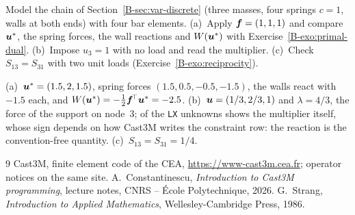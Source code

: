 
\label{exo:cc-springs}
%
Model the chain of Section~\ref{B-sec:var-discrete} (three masses, four
springs $c=1$, walls at both ends) with four bar elements. (a)~Apply
$\bm{f}=(1,1,1)$ and compare $\bm{u}^\ast$, the spring forces, the wall reactions and
$W(\bm{u}^\ast)$ with Exercise~\ref{B-exo:primal-dual}. (b)~Impose $u_3=1$ with no
load and read the multiplier. (c)~Check $S_{13}=S_{31}$ with two unit loads
(Exercise~\ref{B-exo:reciprocity}).
\begin{solution}
(a)~$\bm{u}^\ast=(1.5,2,1.5)$, spring forces $(1.5,0.5,-0.5,-1.5)$, the walls
react with $-1.5$ each, and $W(\bm{u}^\ast)=-\tfrac12\bm{f}^{\!\top}\bm{u}^\ast=-2.5$.
(b)~$\bm{u}=(1/3,2/3,1)$ and $\lambda=4/3$, the force of the support on node~3;
 of the \texttt{LX} unknowns shows the multiplier itself, whose sign
depends on how Cast3M writes the constraint row: the reaction is the
convention-free quantity. (c)~$S_{13}=S_{31}=1/4$.

\end{solution}

\begin{chapterbib}{9}
 Cast3M, finite element code of the CEA,
  \url{https://www-cast3m.cea.fr}; operator notices on the same site.
 A.~Constantinescu, \emph{Introduction to Cast3M
  programming}, lecture notes, CNRS -- \'Ecole Polytechnique, 2026.
 G.~Strang, \emph{Introduction to Applied Mathematics},
  Wellesley-Cambridge Press, 1986.
\end{chapterbib}
